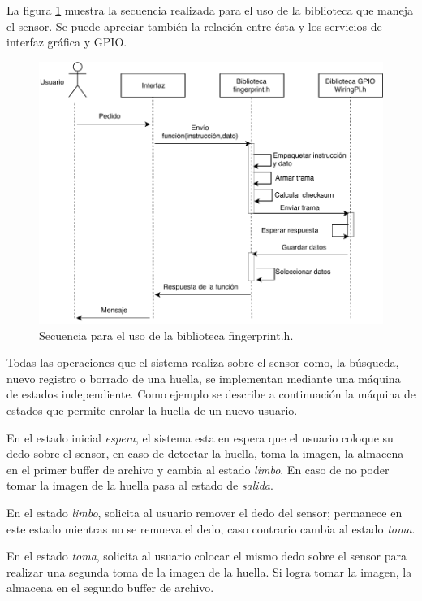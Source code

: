 La figura \ref{fig:finger} muestra la secuencia  realizada para el uso de la biblioteca que maneja el sensor. Se puede apreciar también la relación entre ésta y los servicios de interfaz gráfica y GPIO.

\begin{figure}[H]
	\centering
	\includegraphics[scale=.9]{./Figures/finger.pdf}
	\caption{Secuencia para el uso de la biblioteca fingerprint.h.}
	\label{fig:finger}
\end{figure}

Todas las operaciones que el sistema realiza sobre el sensor como, la búsqueda, nuevo registro o borrado de una huella, se implementan mediante una máquina de estados independiente.
Como ejemplo se describe a continuación la máquina de estados que permite enrolar la huella de un nuevo usuario.

En el estado inicial \textit{espera}, el sistema esta en espera que el usuario coloque su dedo sobre el sensor, en caso de detectar la huella, toma la imagen, la almacena en el primer buffer de archivo y cambia al estado \textit{limbo}. En caso de no poder tomar la imagen de la huella pasa al estado de \textit{salida}.

En el estado \textit{limbo}, solicita al usuario remover el dedo del sensor; permanece en este estado mientras no se remueva el dedo, caso contrario cambia al estado \textit{toma}.

En el estado \textit{toma}, solicita al usuario colocar el mismo dedo sobre el sensor para realizar una segunda toma de la imagen de la huella. Si logra  tomar la imagen, la almacena en el segundo buffer de archivo. 

